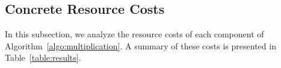 \documentclass[reprint,amsmath,amssymb,aps,pra]{revtex4-2}
\begin{document}

\subsection{Concrete Resource Costs}

In this subsection, we analyze the resource costs of each component of Algorithm~\ref{algo:multiplication}. A summary of these costs is presented in Table~\ref{table:results}.
\end{document}
